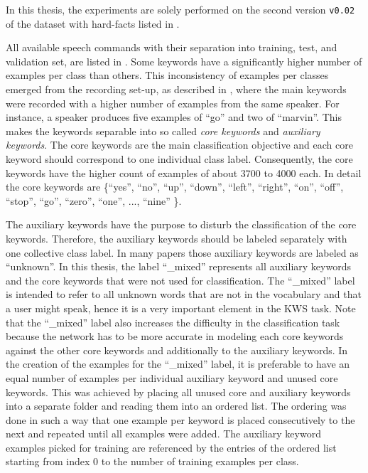 In this thesis, the experiments are solely performed on the second version \texttt{v0.02} of the dataset with hard-facts listed in .

All available speech commands with their separation into training, test, and validation set, are listed in .
Some keywords have a significantly higher number of examples per class than others.
This inconsistency of examples per classes emerged from the recording set-up, as described in \cite{Warden2018SpeechCommands}, where the main keywords were recorded with a higher number of examples from the same speaker.
For instance, a speaker produces five examples of \enquote{go} and two of \enquote{marvin}.
This makes the keywords separable into so called \emph{core keywords} and \emph{auxiliary keywords}.
The core keywords are the main classification objective and each core keyword should correspond to one individual class label.
Consequently, the core keywords have the higher count of examples of about 3700 to 4000 each.
In detail the core keywords are \{\enquote{yes}, \enquote{no}, \enquote{up}, \enquote{down}, \enquote{left}, \enquote{right}, \enquote{on}, \enquote{off}, \enquote{stop}, \enquote{go}, \enquote{zero}, \enquote{one}, ..., \enquote{nine} \}.

The auxiliary keywords have the purpose to disturb the classification of the core keywords.
Therefore, the auxiliary keywords should be labeled separately with one collective class label.
In many papers those auxiliary keywords are labeled as \enquote{unknown}.
In this thesis, the label \enquote{\_mixed} represents all auxiliary keywords and the core keywords that were not used for classification.
The \enquote{\_mixed} label is intended to refer to all unknown words that are not in the vocabulary and that a user might speak, hence it is a very important element in the KWS task.
Note that the \enquote{\_mixed} label also increases the difficulty in the classification task because the network has to be more accurate in modeling each core keywords against the other core keywords and additionally to the auxiliary keywords.
In the creation of the examples for the \enquote{\_mixed} label, it is preferable to have an equal number of examples per individual auxiliary keyword and unused core keywords.
This was achieved by placing all unused core and auxiliary keywords into a separate folder and reading them into an ordered list.
The ordering was done in such a way that one example per keyword is placed consecutively to the next and repeated until all examples were added.
The auxiliary keyword examples picked for training are referenced by the entries of the ordered list starting from index 0 to the number of training examples per class.


